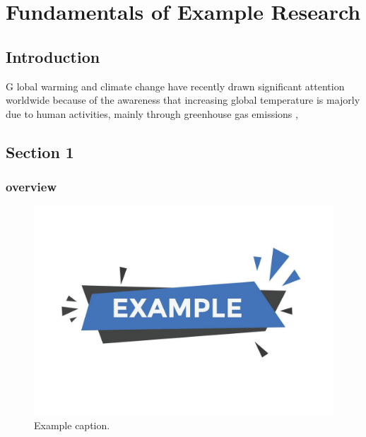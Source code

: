 
\chapter{Fundamentals of Example Research}  \label{CH1}

\section{Introduction} \label{CH1:Intero}
 \lettrine[lines=3, lhang=0.1, loversize=0.1]{G}{}  lobal warming and climate change have recently drawn significant attention worldwide because of the awareness  that increasing global temperature is majorly due to human activities, mainly through greenhouse gas emissions \cite{mazouziComprehensiveOptimizationFuzzy2024}, 
 
 \lipsum[1-5]\cite{mazouziDesignFuzzyLogic2023}
 \lipsum[1-4]
 


\section{Section 1} 
\lipsum[1] 


	\subsection{ overview}  
	\lipsum[1] 
	
	\begin{figure}[h!]
		\centering
		\includegraphics[width=\textwidth]{Figures/Ch1/example}
		\caption{Example caption.}
		\label{fig1.1:example}
		
	\end{figure}
	
